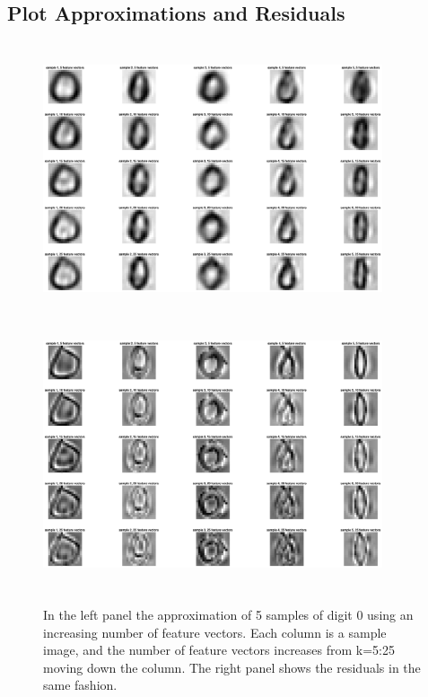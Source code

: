 \documentclass{article}
\begin{document}
\subsection*{Plot Approximations and Residuals}
    \begin{figure}[!h]
        \centerline
        {
        \includegraphics[width=10cm, height=8cm] {Q_2_0_approx}\includegraphics[width=10cm, height=8cm]{Q_2_0_residual}
        }
        \caption{\label{fig:my figure}  In the left panel the approximation of 5 samples of digit 0 using an increasing number of feature vectors.  Each column is a sample image, and the number of feature vectors increases from k=5:25 moving down the column.  The right panel shows the residuals in the same fashion.}
    \end{figure}
    
\end{document}
